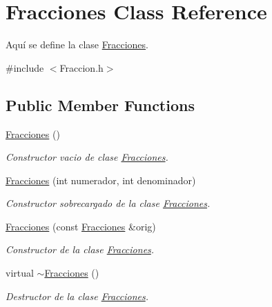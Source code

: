 \hypertarget{class_fracciones}{}\section{Fracciones Class Reference}
\label{class_fracciones}


Aquí se define la clase \hyperlink{class_fracciones}{Fracciones}.  




{\ttfamily \#include $<$Fraccion.\+h$>$}

\subsection*{Public Member Functions}
\begin{DoxyCompactItemize}
\item 
\hypertarget{class_fracciones_a1b23547cc711fb2ca3c2ab730ad21d00}{}\label{class_fracciones_a1b23547cc711fb2ca3c2ab730ad21d00} 
\hyperlink{class_fracciones_a1b23547cc711fb2ca3c2ab730ad21d00}{Fracciones} ()
\begin{DoxyCompactList}\small\item\em Constructor vacio de clase \hyperlink{class_fracciones}{Fracciones}. \end{DoxyCompactList}\item 
\hyperlink{class_fracciones_a23704ae511c81eccfe748de696b1950f}{Fracciones} (int numerador, int denominador)
\begin{DoxyCompactList}\small\item\em Constructor sobrecargado de la clase \hyperlink{class_fracciones}{Fracciones}. \end{DoxyCompactList}\item 
\hyperlink{class_fracciones_a211a40600cc66d68cbb1f3d7298b08b2}{Fracciones} (const \hyperlink{class_fracciones}{Fracciones} \&orig)
\begin{DoxyCompactList}\small\item\em Constructor de la clase \hyperlink{class_fracciones}{Fracciones}. \end{DoxyCompactList}\item 
\hypertarget{class_fracciones_a66c3f51e010c7411cd86968bbf62345d}{}\label{class_fracciones_a66c3f51e010c7411cd86968bbf62345d} 
virtual \hyperlink{class_fracciones_a66c3f51e010c7411cd86968bbf62345d}{$\sim$\+Fracciones} ()
\begin{DoxyCompactList}\small\item\em Destructor de la clase \hyperlink{class_fracciones}{Fracciones}. \end{DoxyCompactList}\item 

\end{DoxyCompactItemize}
